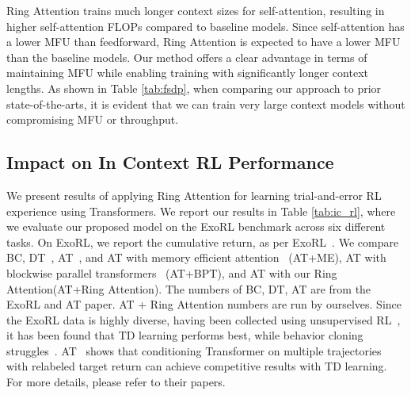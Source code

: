 \documentclass{article}
\newcommand{\ours}{{Ring Attention}\xspace}
\newcommand{\oursabb}{{Ring Attention}\xspace}
\begin{document}
\oursabb trains much longer context sizes for self-attention, resulting in higher self-attention FLOPs compared to baseline models. Since self-attention has a lower MFU than feedforward, \oursabb is expected to have a lower MFU than the baseline models.
Our method offers a clear advantage in terms of maintaining MFU while enabling training with significantly longer context lengths. As shown in Table \ref{tab:fsdp}, when comparing our approach to prior state-of-the-arts, it is evident that we can train very large context models without compromising MFU or throughput.


\subsection{Impact on In Context RL Performance}
We present results of applying \ours for learning trial-and-error RL experience using Transformers.
We report our results in Table \ref{tab:ic_rl}, where we evaluate our proposed model on the ExoRL benchmark across six different tasks.
On ExoRL, we report the cumulative return, as per ExoRL~\citep{yarats2022don}.
We compare BC, DT~\citep{chen2021decision}, AT~\citep{liu2023agent}, and AT with memory efficient attention~\citep{rabe2021self} (AT+ME), AT with blockwise parallel transformers~\citep{liu2023blockwise} (AT+BPT), and AT with our \ours (AT+\oursabb).
The numbers of BC, DT, AT are from the ExoRL and AT paper.
AT + \ours numbers are run by ourselves.
Since the ExoRL data is highly diverse, having been collected using unsupervised RL~\citep{laskin2021urlb}, it has been found that TD learning performs best, while behavior cloning struggles~\citep{yarats2022don}.
AT~\citep{liu2023agent} shows that conditioning Transformer on multiple trajectories with relabeled target return can achieve competitive results with TD learning. For more details, please refer to their papers.
\end{document}
